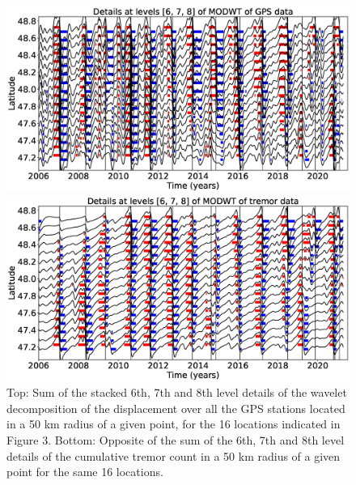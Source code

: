 \documentclass{article}
\begin{document}
\begin{figure}
\noindent\includegraphics[width=\textwidth, trim={0cm 0cm 0cm 0cm},clip]{figures/GPS_longer_detail_6-7-8.eps}

\noindent\includegraphics[width=\textwidth, trim={0cm 0cm 0cm 0cm},clip]{figures/tremor_longer_detail_6-7-8.eps}
\caption{Top: Sum of the stacked 6th, 7th and 8th level details of the wavelet decomposition of the displacement over all the GPS stations located in a 50 km radius of a given point, for the 16 locations indicated in Figure 3. Bottom: Opposite of the sum of the 6th, 7th and 8th level details of the cumulative tremor count in a 50 km radius of a given point for the same 16 locations.}
\label{pngfiguresample}
\end{figure}
\end{document}
